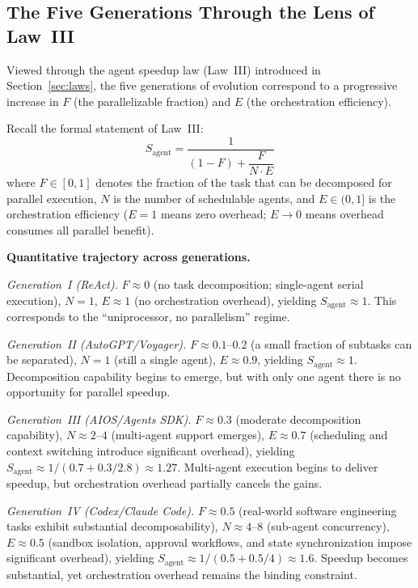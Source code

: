 \documentclass[11pt,a4paper]{article}
\begin{document}
\subsection{The Five Generations Through the Lens of Law~III}

Viewed through the agent speedup law (Law~III) introduced in Section~\ref{sec:laws}, the five generations of evolution correspond to a progressive increase in $F$ (the parallelizable fraction) and $E$ (the orchestration efficiency).

Recall the formal statement of Law~III:
\begin{equation}
\label{eq:agent_law_review}
S_{\mathrm{agent}} = \frac{1}{(1-F) + \dfrac{F}{N \cdot E}}
\end{equation}
where $F \in [0,1]$ denotes the fraction of the task that can be decomposed for parallel execution, $N$ is the number of schedulable agents, and $E \in (0,1]$ is the orchestration efficiency ($E=1$ means zero overhead; $E\to 0$ means overhead consumes all parallel benefit).

\textbf{Quantitative trajectory across generations.}

\textit{Generation~I (ReAct).}
$F \approx 0$ (no task decomposition; single-agent serial execution), $N=1$, $E \approx 1$ (no orchestration overhead), yielding $S_{\mathrm{agent}} \approx 1$.
This corresponds to the ``uniprocessor, no parallelism'' regime.

\textit{Generation~II (AutoGPT/Voyager).}
$F \approx 0.1$--$0.2$ (a small fraction of subtasks can be separated), $N=1$ (still a single agent), $E \approx 0.9$, yielding $S_{\mathrm{agent}} \approx 1$.
Decomposition capability begins to emerge, but with only one agent there is no opportunity for parallel speedup.

\textit{Generation~III (AIOS/Agents SDK).}
$F \approx 0.3$ (moderate decomposition capability), $N \approx 2$--$4$ (multi-agent support emerges), $E \approx 0.7$ (scheduling and context switching introduce significant overhead), yielding $S_{\mathrm{agent}} \approx 1/(0.7 + 0.3/2.8) \approx 1.27$.
Multi-agent execution begins to deliver speedup, but orchestration overhead partially cancels the gains.

\textit{Generation~IV (Codex/Claude Code).}
$F \approx 0.5$ (real-world software engineering tasks exhibit substantial decomposability), $N \approx 4$--$8$ (sub-agent concurrency), $E \approx 0.5$ (sandbox isolation, approval workflows, and state synchronization impose significant overhead), yielding $S_{\mathrm{agent}} \approx 1/(0.5 + 0.5/4) \approx 1.6$.
Speedup becomes substantial, yet orchestration overhead remains the binding constraint.
\end{document}
